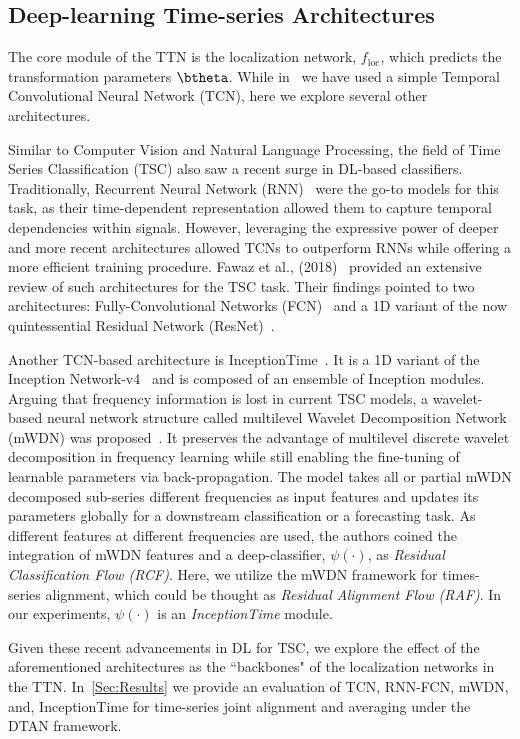 \subsection{Deep-learning Time-series Architectures}
The core module of the TTN is the localization network, $f_{\mathrm{loc}}$, which predicts the transformation parameters $\btheta$.
While in~\cite{Shapira:NIPS:2019:DTAN} we have used a simple Temporal Convolutional Neural Network (TCN), here we explore several other 
architectures.

Similar to Computer Vision and Natural Language Processing, the field of Time Series Classification (TSC) also saw 
a recent surge in DL-based classifiers. 
Traditionally, Recurrent Neural Network (RNN)~\cite{Husken:neuro:2003:recurrent,Mikolov:inter:2010:recurrent} were the 
go-to models for this task, as their time-dependent representation allowed them to capture temporal dependencies within signals.
However, leveraging the expressive power of deeper and more recent architectures allowed TCNs to outperform RNNs while offering 
a more efficient training procedure. Fawaz et al., (2018)~\cite{fawaz:2018:deep} provided an extensive review of such architectures
for the TSC task. Their findings pointed to two architectures: Fully-Convolutional Networks (FCN)~\cite{wang:2017:time} and a 1D variant of the
now quintessential Residual Network (ResNet)~\cite{He:ECCV:2016:resnet}.

Another TCN-based architecture is InceptionTime~\cite{Ismail:2020:inceptiontime}. It is a 1D variant of the Inception Network-v4~\cite{Szegedy:AAAI:2017:inception} and is composed of
 an ensemble of Inception modules.
Arguing that frequency information is lost in current TSC models, a wavelet-based neural network structure called multilevel Wavelet
Decomposition Network (mWDN) was proposed~\cite{wang:SIGKDD:multilevel:2018}. It preserves
the advantage of multilevel discrete wavelet decomposition in frequency learning while still enabling the fine-tuning of learnable parameters via 
 back-propagation. The model takes all or partial mWDN decomposed sub-series
  different frequencies as input features and updates its parameters globally for a downstream classification or a forecasting task. As different 
 features at different frequencies are used, the authors coined the integration of mWDN features and a deep-classifier, $\psi(\cdot)$, as 
 \emph{Residual Classification Flow (RCF)}. Here, we utilize the mWDN framework for times-series alignment, which could be thought as 
 \emph{Residual Alignment Flow (RAF)}. In our experiments, $\psi(\cdot)$ is an \emph{InceptionTime} module.
 
Given these recent advancements in DL for TSC, we explore the effect of the aforementioned architectures as 
the ``backbones" of the localization networks in the TTN. In~\autoref{Sec:Results} we provide an evaluation of TCN, 
RNN-FCN, mWDN, and, InceptionTime for time-series joint alignment and averaging under the DTAN framework.
